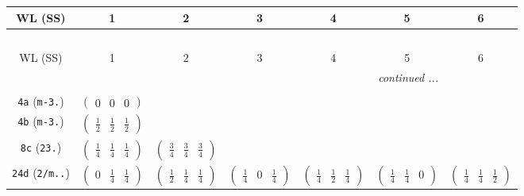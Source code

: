 \documentclass[fleqn,9pt,landscape]{jsarticle}
\begin{document}
\begin{center}
\renewcommand{\arraystretch}{1.2}
\begin{longtable}{ccccccc}
 \hline \hline
WL (SS) & 1 & 2 & 3 & 4 & 5 & 6 \\ \hline \endfirsthead

\multicolumn{6}{l}{\tablename\ \thetable{}} \\
 \hline \hline
WL (SS) & 1 & 2 & 3 & 4 & 5 & 6 \\ \hline \endhead

 \hline \hline
\multicolumn{6}{r}{\footnotesize\it continued ...} \\ \endfoot

 \hline \hline
\multicolumn{6}{r}{} \\ \endlastfoot

{\tt 4a} ({\tt m-3.}) & $ \begin{pmatrix} 0 & 0 & 0 \end{pmatrix} $ & $  $ & $  $ & $  $ & $  $ & $  $ \\ \hline
{\tt 4b} ({\tt m-3.}) & $ \begin{pmatrix} \frac{1}{2} & \frac{1}{2} & \frac{1}{2} \end{pmatrix} $ & $  $ & $  $ & $  $ & $  $ & $  $ \\ \hline
{\tt 8c} ({\tt 23.}) & $ \begin{pmatrix} \frac{1}{4} & \frac{1}{4} & \frac{1}{4} \end{pmatrix} $ & $ \begin{pmatrix} \frac{3}{4} & \frac{3}{4} & \frac{3}{4} \end{pmatrix} $ & $  $ & $  $ & $  $ & $  $ \\ \hline
{\tt 24d} ({\tt 2/m..}) & $ \begin{pmatrix} 0 & \frac{1}{4} & \frac{1}{4} \end{pmatrix} $ & $ \begin{pmatrix} \frac{1}{2} & \frac{1}{4} & \frac{1}{4} \end{pmatrix} $ & $ \begin{pmatrix} \frac{1}{4} & 0 & \frac{1}{4} \end{pmatrix} $ & $ \begin{pmatrix} \frac{1}{4} & \frac{1}{2} & \frac{1}{4} \end{pmatrix} $ & $ \begin{pmatrix} \frac{1}{4} & \frac{1}{4} & 0 \end{pmatrix} $ & $ \begin{pmatrix} \frac{1}{4} & \frac{1}{4} & \frac{1}{2} \end{pmatrix} $ \\ \hline

\end{longtable}
\end{center}
\end{document}
